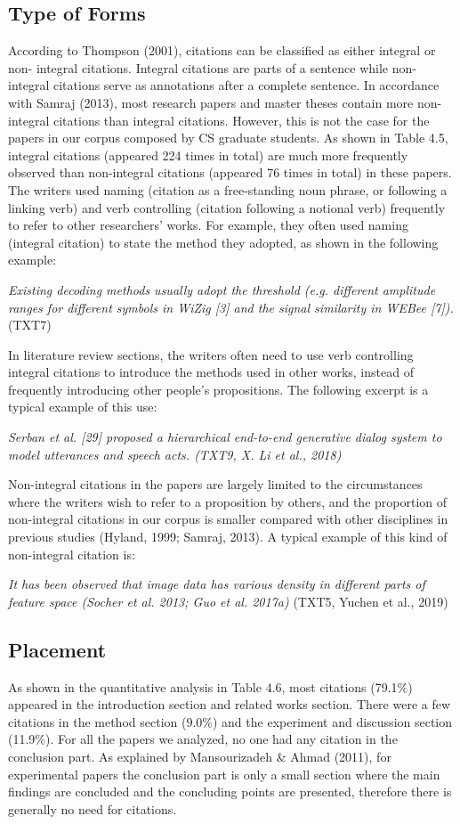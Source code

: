 \subsection{Type of Forms}
According to Thompson (2001), citations can be classified as either integral or non- integral citations. Integral citations are parts of a sentence while non-integral citations serve as annotations after a complete sentence. In accordance with Samraj (2013), most research papers and master theses contain more non-integral citations than integral citations. However, this is not the case for the papers in our corpus composed by CS graduate students. As shown in Table 4.5, integral citations (appeared 224 times in total) are much more frequently observed than non-integral citations (appeared 76 times in total) in these papers. The writers used naming (citation as a free-standing noun phrase, or following a linking verb) and verb controlling (citation following a notional verb) frequently to refer to other researchers’ works. For example, they often used naming (integral citation) to state the method they adopted, as shown in the following example:

\textit{Existing decoding methods usually adopt the threshold (e.g. different amplitude ranges for different symbols in WiZig [3] and the signal similarity in WEBee [7]).} (TXT7)


In literature review sections, the writers often need to use verb controlling integral citations to introduce the methods used in other works, instead of frequently introducing other people’s propositions. The following excerpt is a typical example of this use:

\textit{Serban et al. [29] proposed a hierarchical end-to-end generative dialog system to model utterances and speech acts. (TXT9, X. Li et al., 2018)}

Non-integral citations in the papers are largely limited to the circumstances where the writers wish to refer to a proposition by others, and the proportion of non-integral citations in our corpus is smaller compared with other disciplines in previous studies (Hyland, 1999; Samraj, 2013). A typical example of this kind of non-integral citation is:

\textit{It has been observed that image data has various density in different parts of feature space (Socher et al. 2013; Guo et al. 2017a)} (TXT5, Yuchen et al., 2019)

\subsection{Placement}
As shown in the quantitative analysis in Table 4.6, most citations (79.1\%) appeared in the introduction section and related works section. There were a few citations in the method section (9.0\%) and the experiment and discussion section (11.9\%). For all the papers we analyzed, no one had any citation in the conclusion part. As explained by Mansourizadeh \& Ahmad (2011), for experimental papers the conclusion part is only a small section where the main findings are concluded and the concluding points are presented, therefore there is generally no need for citations.

